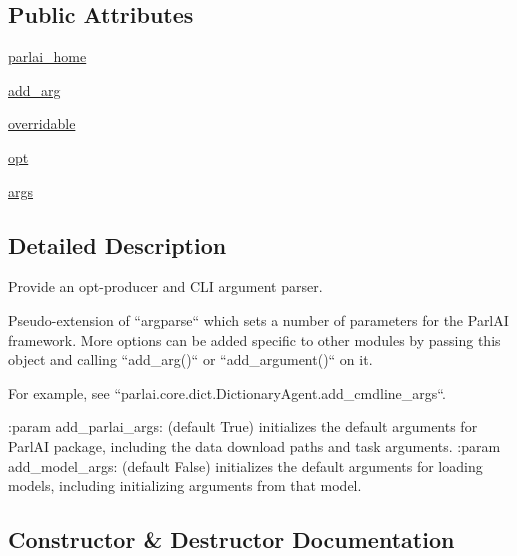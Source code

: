 \subsection*{Public Attributes}
\begin{DoxyCompactItemize}
\item 
\hyperlink{classparlai_1_1core_1_1params_1_1ParlaiParser_a5ec04b6d66c84a0418930aac367bcc35}{parlai\+\_\+home}
\item 
\hyperlink{classparlai_1_1core_1_1params_1_1ParlaiParser_a7049960456af2af847ac8721d93cda0a}{add\+\_\+arg}
\item 
\hyperlink{classparlai_1_1core_1_1params_1_1ParlaiParser_a553d6c6c3576b217b0602befa0325e6a}{overridable}
\item 
\hyperlink{classparlai_1_1core_1_1params_1_1ParlaiParser_aa7c461e146b468d033fea1d1dcd92bcf}{opt}
\item 
\hyperlink{classparlai_1_1core_1_1params_1_1ParlaiParser_a27d35bfa073588bf887cbdbf45c19f39}{args}
\end{DoxyCompactItemize}


\subsection{Detailed Description}
\begin{DoxyVerb}Provide an opt-producer and CLI argument parser.

Pseudo-extension of ``argparse`` which sets a number of parameters
for the ParlAI framework. More options can be added specific to other
modules by passing this object and calling ``add_arg()`` or
``add_argument()`` on it.

For example, see ``parlai.core.dict.DictionaryAgent.add_cmdline_args``.

:param add_parlai_args:
    (default True) initializes the default arguments for ParlAI
    package, including the data download paths and task arguments.
:param add_model_args:
    (default False) initializes the default arguments for loading
    models, including initializing arguments from that model.
\end{DoxyVerb}
 

\subsection{Constructor \& Destructor Documentation}
\mbox{\label{classparlai_1_1core_1_1params_1_1ParlaiParser_ab1d55b343c804984783548bec009a695}} 
